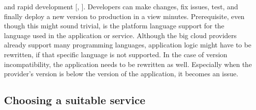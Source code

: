 \documentclass[11pt]{article}
\begin{document}
and rapid development [\cite{sewak2018winning}, \cite{leitner2019mixed}]. Developers can make changes, fix issues, test, and finally deploy a new version to production in a view minutes. Prerequisite, even though this might sound trivial, is the platform language support for the language used in the application or service. Although the big cloud providers already support many programming languages, application logic might have to be rewritten, if that specific language is not supported. In the case of version incompatibility, the application needs to be rewritten as well. Especially when the provider's version is below the version of the application, it becomes an issue.


\subsection{Choosing a suitable service}
\end{document}

